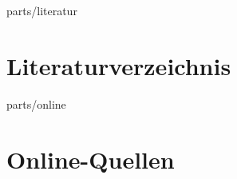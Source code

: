 \documentclass[11pt,a4paper]{article}
\begin{document}







\setcounter{page}{1}

















\begin{btSect}{parts/literatur}
\section*{Literaturverzeichnis}
\btPrintCited
\end{btSect}
\begin{btSect}{parts/online}
\section*{Online-Quellen}
\btPrintCited
\end{btSect}
\end{document}
